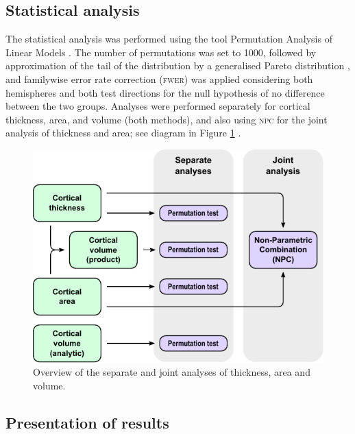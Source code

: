 \subsection{Statistical analysis}

The statistical analysis was performed using the tool Permutation Analysis of Linear Models \citep[\textsc{palm}; ][see also Section~\ref{sec:conclusion:palm}]{Winkler2014, Winkler2016_npc}. The number of permutations was set to 1000, followed by approximation of the tail of the distribution by a generalised Pareto distribution \citep[\textsc{gpd}; ][see also Chapter \ref{sec:accel}]{Winkler2016_fast}, and familywise error rate correction (\textsc{fwer}) was applied considering both hemispheres and both test directions for the null hypothesis of no difference between the two groups. Analyses were performed separately for cortical thickness, area, and volume (both methods), and also using \textsc{npc} for the joint analysis of thickness and area; see diagram in Figure \ref{fig:flowstats}	.

\begin{figure}[!tp]
\begin{center}
\includegraphics{figures/flowstats.pdf}
\caption[Overview of the separate and joint analyses of thickness, area and volume.]{Overview of the separate and joint analyses of thickness, area and volume.}
\label{fig:flowstats}
\end{center}
\end{figure}

\subsection{Presentation of results}

